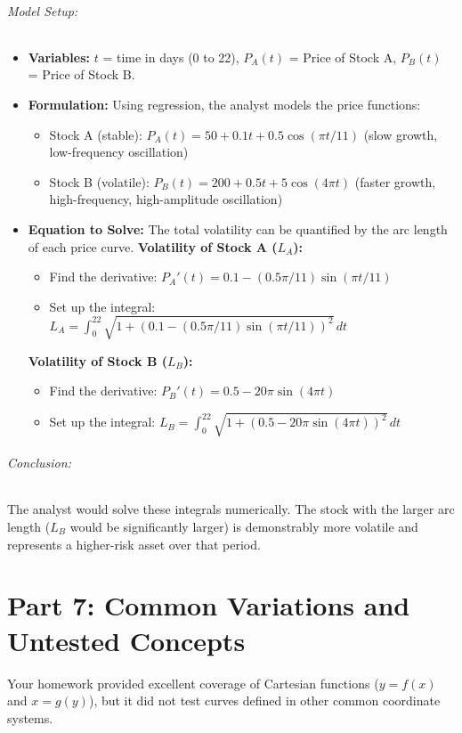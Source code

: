 \documentclass{article}
\begin{document}
\paragraph{Model Setup:}
\begin{itemize}
    \item \textbf{Variables:} $t$ = time in days (0 to 22), $P_A(t)$ = Price of Stock A, $P_B(t)$ = Price of Stock B.
    \item \textbf{Formulation:} Using regression, the analyst models the price functions:
    \begin{itemize}
        \item Stock A (stable): $P_A(t) = 50 + 0.1t + 0.5\cos(\pi t/11)$ (slow growth, low-frequency oscillation)
        \item Stock B (volatile): $P_B(t) = 200 + 0.5t + 5\cos(4\pi t)$ (faster growth, high-frequency, high-amplitude oscillation)
    \end{itemize}
    \item \textbf{Equation to Solve:} The total volatility can be quantified by the arc length of each price curve.
    \subitem \textbf{Volatility of Stock A ($L_A$):}
    \begin{itemize}
        \item Find the derivative: $P_A'(t) = 0.1 - (0.5\pi/11)\sin(\pi t/11)$
        \item Set up the integral: $L_A = \int_{0}^{22} \sqrt{1 + (0.1 - (0.5\pi/11)\sin(\pi t/11))^2} \,dt$
    \end{itemize}
    \subitem \textbf{Volatility of Stock B ($L_B$):}
    \begin{itemize}
        \item Find the derivative: $P_B'(t) = 0.5 - 20\pi\sin(4\pi t)$
        \item Set up the integral: $L_B = \int_{0}^{22} \sqrt{1 + (0.5 - 20\pi\sin(4\pi t))^2} \,dt$
    \end{itemize}
\end{itemize}
\paragraph{Conclusion:} The analyst would solve these integrals numerically. The stock with the larger arc length ($L_B$ would be significantly larger) is demonstrably more volatile and represents a higher-risk asset over that period.

\part*{Part 7: Common Variations and Untested Concepts}
Your homework provided excellent coverage of Cartesian functions ($y=f(x)$ and $x=g(y)$), but it did not test curves defined in other common coordinate systems.
\end{document}
